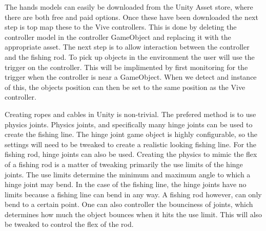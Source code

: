 \documentclass[10pt,journal,compsoc,onecolumn, draftclsnofoot]{IEEEtran}
\begin{document}
The hands models can easily be downloaded from the Unity Asset store, where there are both free and paid options.
Once these have been downloaded the next step is top map these to the Vive controllers.
This is done by deleting the controller model in the controller GameObject and replacing it with the appropriate asset.
The next step is to allow interaction between the controller and the fishing rod.
To pick up objects in the environment the user will use the trigger on the controller.
This will be implimented by first monitoring for the trigger when the controller is near a GameObject.
When we detect and instance of this, the objects position can then be set to the same position as the Vive controller.

Creating ropes and cables in Unity is non-trivial.
The prefered method is to use physics joints.
Physics joints, and specifically many hinge joints can be used to create the fishing line.
The hinge joint game object is highly configurable, so the settings will need to be tweaked to create a realistic looking fishing line.
For the fishing rod, hinge joints can also be used.
Creating the physics to mimic the flex of a fishing rod is a matter of tweaking primarily the use limits of the hinge joints.
The use limits determine the minimum and maximum angle to which a hinge joint may bend.
In the case of the fishing line, the hinge joints have no limits because a fishing line can bend in any way.
A fishing rod however, can only bend to a certain point.
One can also controller the bounciness of joints, which determines how much the object bounces when it hits the use limit.
This will also be tweaked to control the flex of the rod.



\end{document}
